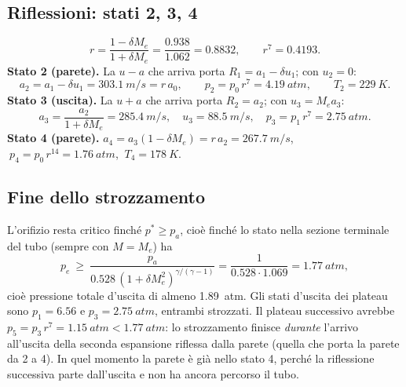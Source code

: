 \documentclass[11pt,a4paper]{article}
\newcommand{\uma}{u-a}
\newcommand{\upa}{u+a}
\begin{document}
\subsection*{Riflessioni: stati 2, 3, 4}
\[
r=\frac{1-\delta M_e}{1+\delta M_e}=\frac{\num{0.938}}{\num{1.062}}=\num{0.8832},\qquad r^{7}=\num{0.4193}.
\]
\textbf{Stato 2 (parete).} La $\uma$ che arriva porta $R_1=a_1-\delta u_1$; con $u_2=0$:
\[
a_2=a_1-\delta u_1=\SI{303.1}{m/s}=r\,a_0,\qquad p_2=p_0\,r^{7}=\SI{4.19}{atm},\qquad T_2=\SI{229}{K}.
\]
\textbf{Stato 3 (uscita).} La $\upa$ che arriva porta $R_2=a_2$; con $u_3=M_ea_3$:
\[
a_3=\frac{a_2}{1+\delta M_e}=\SI{285.4}{m/s},\quad u_3=\SI{88.5}{m/s},\quad p_3=p_1\,r^{7}=\SI{2.75}{atm}.
\]
\textbf{Stato 4 (parete).} $a_4=a_3(1-\delta M_e)=r\,a_2=\SI{267.7}{m/s}$, $\ p_4=p_0\,r^{14}=\SI{1.76}{atm}$,
$\ T_4=\SI{178}{K}$.

\subsection*{Fine dello strozzamento}
L'orifizio resta critico finché $p^*\ge p_a$, cioè finché lo stato nella sezione terminale del tubo (sempre con
$M=M_e$) ha
\[
p_e\ \ge\ \frac{p_a}{\num{0.528}\,(1+\delta M_e^2)^{\gamma/(\gamma-1)}}
=\frac{1}{\num{0.528}\cdot\num{1.069}}=\SI{1.77}{atm},
\]
cioè pressione totale d'uscita di almeno \SI{1.89}{atm}.
Gli stati d'uscita dei plateau sono $p_1=\num{6.56}$ e $p_3=\SI{2.75}{atm}$, entrambi strozzati. Il plateau
successivo avrebbe $p_5=p_3\,r^7=\SI{1.15}{atm}<\SI{1.77}{atm}$: lo strozzamento finisce \emph{durante} l'arrivo
all'uscita della seconda espansione riflessa dalla parete (quella che porta la parete da 2 a 4). In quel momento
la parete è già nello stato 4, perché la riflessione successiva parte dall'uscita e non ha ancora percorso il tubo.
\end{document}
